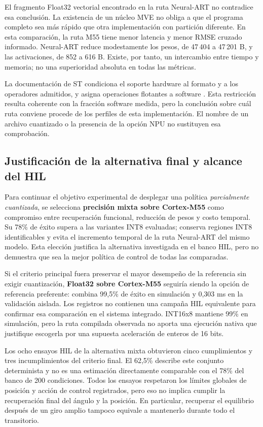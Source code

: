 El fragmento Float32 vectorial encontrado en la ruta Neural-ART no contradice esa conclusión. La existencia de un núcleo MVE no obliga a que el programa completo sea más rápido que otra implementación con partición diferente. En esta comparación, la ruta M55 tiene menor latencia y menor RMSE cruzado informado. Neural-ART reduce modestamente los pesos, de 47\,404 a 47\,201 B, y las activaciones, de 852 a 616 B. Existe, por tanto, un intercambio entre tiempo y memoria; no una superioridad absoluta en todas las métricas.

La documentación de ST condiciona el soporte hardware al formato y a los operadores admitidos, y asigna operaciones flotantes a software \cite{cap4_stoperators}. Esta restricción resulta coherente con la fracción software medida, pero la conclusión sobre cuál ruta conviene procede de los perfiles de esta implementación. El nombre de un archivo cuantizado o la presencia de la opción NPU no sustituyen esa comprobación.

\subsection{Justificación de la alternativa final y alcance del HIL}\label{sec:decision_mpc}
Para continuar el objetivo experimental de desplegar una política \emph{parcialmente cuantizada}, se selecciona \textbf{precisión mixta sobre Cortex-M55} como compromiso entre recuperación funcional, reducción de pesos y costo temporal. Su 78\% de éxito supera a las variantes INT8 evaluadas; conserva regiones INT8 identificables y evita el incremento temporal de la ruta Neural-ART del mismo modelo. Esta elección justifica la alternativa investigada en el banco HIL, pero no demuestra que sea la mejor política de control de todas las comparadas.

Si el criterio principal fuera preservar el mayor desempeño de la referencia sin exigir cuantización, \textbf{Float32 sobre Cortex-M55} seguiría siendo la opción de referencia preferente: combina 99,5\% de éxito en simulación y 0,303 ms en la validación aislada. Los registros no contienen una campaña HIL equivalente para confirmar esa comparación en el sistema integrado. INT16x8 mantiene 99\% en simulación, pero la ruta compilada observada no aporta una ejecución nativa que justifique escogerla por una supuesta aceleración de enteros de 16 bits.

Los ocho ensayos HIL de la alternativa mixta obtuvieron cinco cumplimientos y tres incumplimientos del criterio final. El 62,5\% describe este conjunto determinista y no es una estimación directamente comparable con el 78\% del banco de 200 condiciones. Todos los ensayos respetaron los límites globales de posición y acción de control registrados, pero eso no implica cumplir la recuperación final del ángulo y la posición. En particular, recuperar el equilibrio después de un giro amplio tampoco equivale a mantenerlo durante todo el transitorio.

